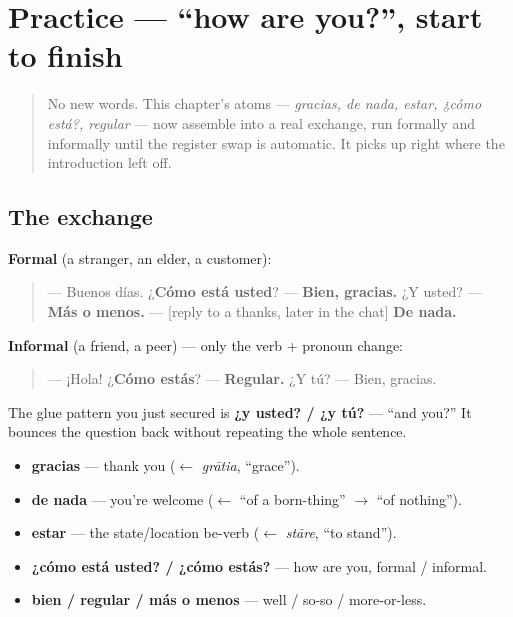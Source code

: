 \section[Practice]{Practice — \textquotedblleft{}how are you?\textquotedblright{}, start to finish}

\label{lesson:ES-C04-practice}



\begin{quote}
No new words. This chapter's atoms — \emph{gracias, de nada, estar, ¿cómo está?, regular} — now assemble into a real exchange, run formally and informally until the register swap is automatic. It picks up right where the introduction left off.
\end{quote}

\subsection*{The exchange}
\textbf{Formal} (a stranger, an elder, a customer):

\begin{quote}
— Buenos días. ¿\textbf{Cómo está usted}? — \textbf{Bien, gracias.} ¿Y usted? — \textbf{Más o menos.} — {[}reply to a thanks, later in the chat{]} \textbf{De nada.}
\end{quote}

\textbf{Informal} (a friend, a peer) — only the verb + pronoun change:

\begin{quote}
— ¡Hola! ¿\textbf{Cómo estás}? — \textbf{Regular.} ¿Y tú? — Bien, gracias.
\end{quote}

The glue pattern you just secured is \textbf{¿y usted? / ¿y tú?} — “and you?” It bounces the question back without repeating the whole sentence.

\begin{grammarlens}[title={What you've built this chapter}]
\begin{itemize}
\raggedright
  \item \textbf{gracias} — thank you ($\leftarrow$ \emph{grātia}, \textquotedblleft{}grace\textquotedblright{}).
  \item \textbf{de nada} — you're welcome ($\leftarrow$ \textquotedblleft{}of a born-thing\textquotedblright{} $\to$ \textquotedblleft{}of nothing\textquotedblright{}).
  \item \textbf{estar} — the state/location be-verb ($\leftarrow$ \emph{stāre}, “to stand”).
  \item \textbf{¿cómo está usted? / ¿cómo estás?} — how are you, formal / informal.
  \item \textbf{bien / regular / más o menos} — well / so-so / more-or-less.
\end{itemize}
\end{grammarlens}

